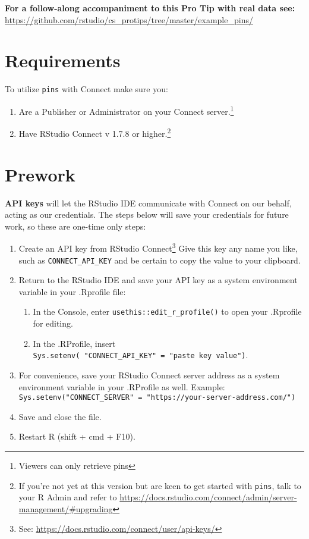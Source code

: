 \documentclass[
  twocolumn]{article}
\providecommand{\tightlist}{%
  \setlength{\itemsep}{0pt}\setlength{\parskip}{0pt}}
\begin{document}
\textbf{For a follow-along accompaniment to this Pro Tip with real data
see:}
\url{https://github.com/rstudio/cs_protips/tree/master/example_pins/}

\hypertarget{requirements}{%
\section{Requirements}\label{requirements}}

To utilize \texttt{pins} with Connect make sure you:

\begin{enumerate}
\def\labelenumi{\arabic{enumi}.}
\tightlist
\item
  Are a Publisher or Administrator on your Connect server.\footnote{Viewers
    can only retrieve pins}
\item
  Have RStudio Connect v 1.7.8 or higher.\footnote{If you're not yet at
    this version but are keen to get started with \texttt{pins}, talk to
    your R Admin and refer to
    \url{https://docs.rstudio.com/connect/admin/server-management/\#upgrading}}
\end{enumerate}

\hypertarget{prework}{%
\section{Prework}\label{prework}}

\textbf{API keys} will let the RStudio IDE communicate with Connect on
our behalf, acting as our credentials. The steps below will save your
credentials for future work, so these are one-time only steps:

\begin{enumerate}
\def\labelenumi{\arabic{enumi}.}
\tightlist
\item
  Create an API key from RStudio Connect\footnote{See:
    \url{https://docs.rstudio.com/connect/user/api-keys/}} Give this key
  any name you like, such as \texttt{CONNECT\_API\_KEY} and be certain
  to copy the value to your clipboard.
\item
  Return to the RStudio IDE and save your API key as a system
  environment variable in your .Rprofile file:

  \begin{enumerate}
  \def\labelenumii{\alph{enumii}.}
  \tightlist
  \item
    In the Console, enter \texttt{usethis::edit\_r\_profile()} to open
    your .Rprofile for editing.
  \item
    In the .RProfile, insert
    \texttt{Sys.setenv(\ "CONNECT\_API\_KEY"\ =\ "paste\ key\ value")}.
  \end{enumerate}
\item
  For convenience, save your RStudio Connect server address as a system
  environment variable in your .RProfile as well. Example:
  \texttt{Sys.setenv("CONNECT\_SERVER"\ =\ "https://your-server-address.com/")}
\item
  Save and close the file.
\item
  Restart R (shift + cmd + F10).
\end{enumerate}
\end{document}

